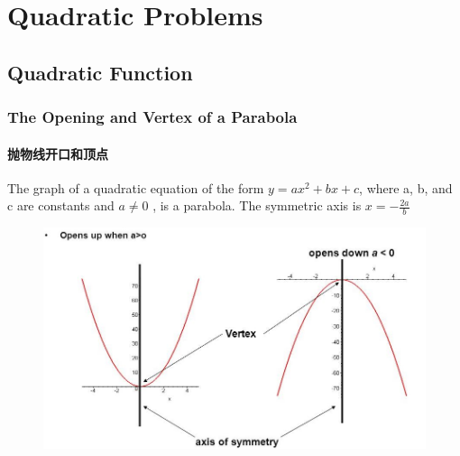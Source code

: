 \documentclass[
	11pt, %
]{beamer}
\begin{document}

\section{Quadratic Problems}


\subsection{Quadratic Function}



\begin{frame}
	\frametitle{The Opening and Vertex of a Parabola}
	\framesubtitle{抛物线开口和顶点}
			\begin{definition}
		The graph of a quadratic equation of the form $y = ax^2 + bx +c $, where a, b, and c are constants and $a\neq 0$ , is a \alert{parabola}. The symmetric axis is  $x= -\frac{2a}{b}$
			\end{definition}

			\begin{figure}
				\includegraphics[width=0.6\linewidth]{Parabola.jpeg}
			\end{figure}

\end{frame}

\end{document}
